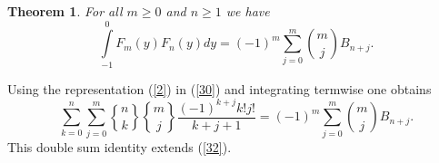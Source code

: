 \documentclass{article}%
\newtheorem{theorem}{Theorem}
\begin{document}
\begin{theorem}
\label{teo2}For all $m\geq0$ and $n\geq1$ we have%
\begin{equation}%
{\displaystyle\int\limits_{-1}^{0}}
F_{m}\left(  y\right)  F_{n}\left(  y\right)  dy=(-1)^{m}\sum_{j=0}^{m}%
\binom{m}{j}B_{n+j}. \label{30}%
\end{equation}

\end{theorem}

Using the representation (\ref{2}) in (\ref{30}) and integrating termwise one
obtains
\[
\sum_{k=0}^{n}\sum_{j=0}^{m}%
\genfrac{\{}{\}}{0pt}{}{n}{k}%
\genfrac{\{}{\}}{0pt}{}{m}{j}%
\frac{\left(  -1\right)  ^{k+j}k!j!}{k+j+1}=(-1)^{m}\sum_{j=0}^{m}\binom{m}%
{j}B_{n+j}.
\]
This double sum identity extends (\ref{32}).
\end{document}
